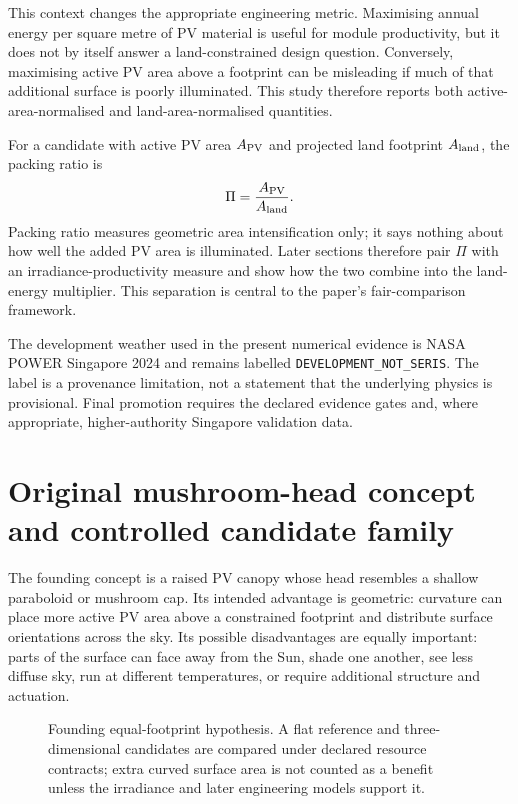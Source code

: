 \documentclass[11pt,a4paper]{article}
\begin{document}
This context changes the appropriate engineering metric. Maximising annual energy per square metre of PV material is useful for module productivity, but it does not by itself answer a land-constrained design question. Conversely, maximising active PV area above a footprint can be misleading if much of that additional surface is poorly illuminated. This study therefore reports both active-area-normalised and land-area-normalised quantities.

For a candidate with active PV area $A_{\rm PV}$ and projected land footprint $A_{\rm land}$, the packing ratio is
\begin{equation}
\Pi=\frac{A_{\rm PV}}{A_{\rm land}}.
\label{eq:packing-ratio-intro}
\end{equation}
Packing ratio measures geometric area intensification only; it says nothing about how well the added PV area is illuminated. Later sections therefore pair $\Pi$ with an irradiance-productivity measure and show how the two combine into the land-energy multiplier. This separation is central to the paper's fair-comparison framework.

The development weather used in the present numerical evidence is NASA POWER Singapore 2024 and remains labelled \texttt{DEVELOPMENT\_NOT\_SERIS}. The label is a provenance limitation, not a statement that the underlying physics is provisional. Final promotion requires the declared evidence gates and, where appropriate, higher-authority Singapore validation data.

\section{Original mushroom-head concept and controlled candidate family}
The founding concept is a raised PV canopy whose head resembles a shallow paraboloid or mushroom cap. Its intended advantage is geometric: curvature can place more active PV area above a constrained footprint and distribute surface orientations across the sky. Its possible disadvantages are equally important: parts of the surface can face away from the Sun, shade one another, see less diffuse sky, run at different temperatures, or require additional structure and actuation.

\begin{figure}[htbp]
\centering

\caption{Founding equal-footprint hypothesis. A flat reference and three-dimensional candidates are compared under declared resource contracts; extra curved surface area is not counted as a benefit unless the irradiance and later engineering models support it.}
\label{fig:equal-footprint}
\end{figure}
\end{document}
